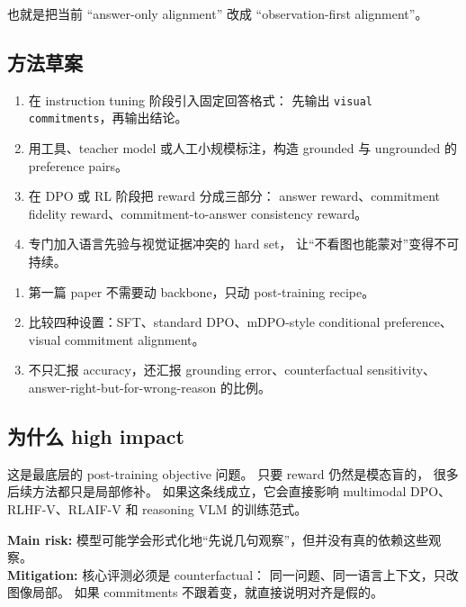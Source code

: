 \documentclass[12pt,a4paper]{article}
\begin{document}
也就是把当前 ``answer-only alignment''
改成 ``observation-first alignment''。

\subsection{方法草案}

\begin{enumerate}[leftmargin=2em]
  \item 在 instruction tuning 阶段引入固定回答格式：
    先输出 \texttt{visual commitments}，再输出结论。
  \item 用工具、teacher model 或人工小规模标注，构造 grounded 与 ungrounded 的 preference pairs。
  \item 在 DPO 或 RL 阶段把 reward 分成三部分：
    answer reward、commitment fidelity reward、commitment-to-answer consistency reward。
  \item 专门加入语言先验与视觉证据冲突的 hard set，
    让``不看图也能蒙对''变得不可持续。
\end{enumerate}

\begin{expbox}
\begin{enumerate}[leftmargin=2em]
  \item 第一篇 paper 不需要动 backbone，只动 post-training recipe。
  \item 比较四种设置：SFT、standard DPO、mDPO-style conditional preference、visual commitment alignment。
  \item 不只汇报 accuracy，还汇报 grounding error、counterfactual sensitivity、answer-right-but-for-wrong-reason 的比例。
\end{enumerate}
\end{expbox}

\subsection{为什么 high impact}

这是最底层的 post-training objective 问题。
只要 reward 仍然是模态盲的，
很多后续方法都只是局部修补。
如果这条线成立，它会直接影响 multimodal DPO、RLHF-V、RLAIF-V 和 reasoning VLM 的训练范式。

\begin{riskbox}
\textbf{Main risk:}
模型可能学会形式化地``先说几句观察''，但并没有真的依赖这些观察。\\
\textbf{Mitigation:}
核心评测必须是 counterfactual：
同一问题、同一语言上下文，只改图像局部。
如果 commitments 不跟着变，就直接说明对齐是假的。
\end{riskbox}
\end{document}
